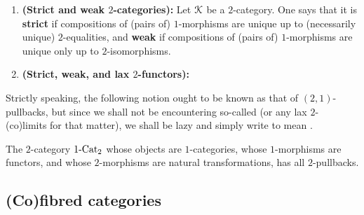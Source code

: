         \begin{definition} \label{def: strict_and_weak_2_categories}
            \noindent
            \begin{enumerate}
                \item \textbf{(Strict and weak $2$-categories):} Let $\mathcal{K}$ be a $2$-category. One says that it is \textbf{strict} if compositions of (pairs of) $1$-morphisms are unique up to (necessarily unique) $2$-equalities, and \textbf{weak} if compositions of (pairs of) $1$-morphisms are unique only up to $2$-isomorphisms.
                \item \textbf{(Strict, weak, and lax $2$-functors):}
            \end{enumerate}
        \end{definition}
        \begin{example}
            
        \end{example}
        
        Strictly speaking, the following notion ought to be known as that of $(2, 1)$-pullbacks, but since we shall not be encountering so-called  (or any lax $2$-(co)limits for that matter), we shall be lazy and simply write  to mean .
        \begin{definition}[$2$-pullbacks] \label{def: 2_pullbacks}
            
        \end{definition}
        \begin{example} \label{example: 2_pullbacks_in_the_2_category_of_categories}
            The $2$-category $1\text{-}\mathrm{Cat}_2$ whose objects are $1$-categories, whose $1$-morphisms are functors, and whose $2$-morphisms are natural transformations, has all $2$-pullbacks.
        \end{example}
    
    \subsection{(Co)fibred categories}
